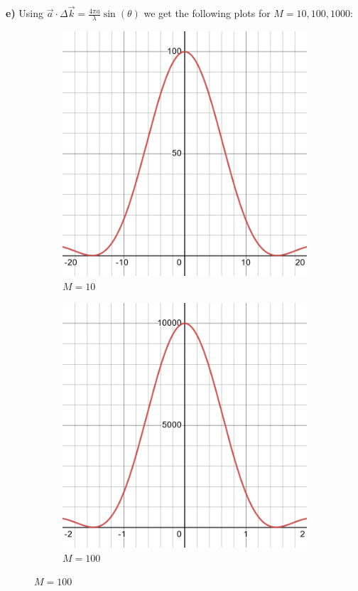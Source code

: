 \documentclass[12pt]{article}
\begin{document}
\textbf{e)} Using $\Vec{a} \cdot \Delta \Vec{k} = \frac{4 \pi a}{\lambda}\sin(\theta)$ we get the following plots for $M = 10,100,1000$:
\begin{figure}[!ht]
    \begin{subfigure}{0.5\textwidth}
        \centering
        \includegraphics[width=\textwidth]{2_XRD/Graphics/Exercises/M=10.png}
        \caption{$M=10$}
        \label{fig:subM10}
    \end{subfigure}
    \begin{subfigure}{0.5\textwidth}
        \centering
        \includegraphics[width=\textwidth]{2_XRD/Graphics/Exercises/M=100.png}
        \caption{$M=100$}
        \label{fig:subM100}
    \end{subfigure}


\end{figure}
\end{document}
